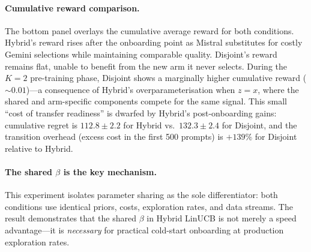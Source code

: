 \paragraph{Cumulative reward comparison.}
The bottom panel overlays the cumulative average reward for both
conditions.
Hybrid's reward rises after the onboarding point as Mistral
substitutes for costly Gemini selections while maintaining
comparable quality.
Disjoint's reward remains flat, unable to benefit from the new
arm it never selects.
During the $K{=}2$ pre-training phase, Disjoint shows a
marginally higher cumulative reward (${\sim}0.01$)---a consequence
of Hybrid's overparameterisation when $z = x$, where the shared
and arm-specific components compete for the same signal.
This small ``cost of transfer readiness'' is dwarfed by Hybrid's
post-onboarding gains: cumulative regret is $112.8 \pm 2.2$
for Hybrid vs.\ $132.3 \pm 2.4$ for Disjoint, and the transition
overhead (excess cost in the first 500 prompts) is $+139\%$ for
Disjoint relative to Hybrid.

\paragraph{The shared $\beta$ is the key mechanism.}
This experiment isolates parameter sharing as the sole
differentiator: both conditions use identical priors, costs,
exploration rates, and data streams.
The result demonstrates that the shared $\beta$ in Hybrid LinUCB
is not merely a speed advantage---it is \emph{necessary} for
practical cold-start onboarding at production exploration rates.
